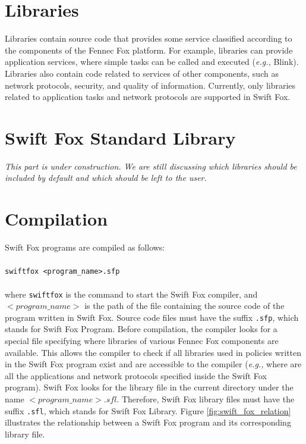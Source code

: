 \documentclass[11pt]{article}
\begin{document}
\section{Libraries}

Libraries contain source code that provides some service classified
according to the components of the Fennec Fox platform. For example,
libraries can provide application services, where simple tasks can be
called and executed (\textit{e.g.,} Blink). Libraries also contain code
related to services of other components, such as network protocols,
security, and quality of information. Currently, only libraries related to 
application tasks and network protocols are supported in Swift Fox.


\section{Swift Fox Standard Library}

\textit{This part is under construction. We are still discussing which
libraries should be included by default and which should be left to the
user.}


\section{Compilation}
\label{sec:compilation}

Swift Fox programs are compiled as follows:     			\\
\\
\texttt{swiftfox <program\_name>.sfp}          				\\
\\
where \texttt{swiftfox} is the command to start the Swift Fox compiler, and
$<program\_name>$ is the path of the file containing the source code of the
program written in Swift Fox. Source code files must have the suffix
\texttt{.sfp}, which stands for Swift Fox Program. Before compilation, the
compiler looks for a special file specifying where libraries of various
Fennec Fox components are available. This allows the compiler to check if
all libraries used in policies written in the Swift Fox program exist and
are accessible to the compiler (\textit{e.g.,} where are all the
applications and network protocols specified inside the Swift Fox program).
Swift Fox looks for the library file in the current directory under the
name $<program\_name>.sfl$. Therefore, Swift Fox library files must have
the suffix \texttt{.sfl}, which stands for Swift Fox Library. Figure
\ref{fig:swift_fox_relation} illustrates the relationship between a Swift
Fox program and its corresponding library file.
\end{document}

